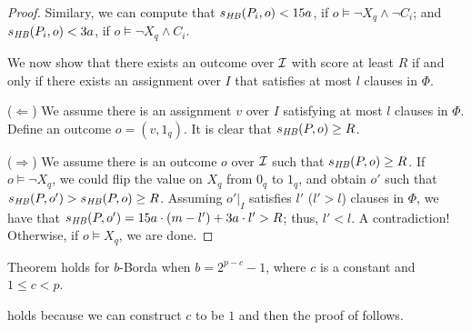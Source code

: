 \begin{proof}
Similary, we can compute that
$s_{\mathit{HB}}(P_i,o)<15a$, if $o \models \neg X_q \land \neg C_i$; and
$s_{\mathit{HB}}(P_i,o)<3a$, if $o \models \neg X_q \land C_i$.

We now show that there exists an outcome over $\mathcal{I}$ with score at least 
$R$ if and only if there exists an assignment over $I$ that satisfies at 
most $l$ clauses in $\Phi$.

\smallskip
\noindent
($\Leftarrow$) We assume there is an assignment $v$ over $I$ satisfying at 
most $l$ clauses in $\Phi$. Define an outcome $o=(v,1_q)$. It is clear 
that $s_{\mathit{HB}}(P,o)\geq R$.

\smallskip
\noindent
($\Rightarrow$) We assume there is an outcome $o$ over $\mathcal{I}$ such that 
$s_{\mathit{HB}}(P,o)\geq R$. If $o \models \neg X_q$, we could flip the value 
on $X_q$ from $0_q$ to $1_q$, and obtain $o'$ such that 
$s_{\mathit{HB}}(P,o')>s_{\mathit{HB}}(P,o)\geq R$. Assuming $o'|_I$ satisfies $l'$ 
($l'>l$) clauses in $\Phi$, we have that 
$s_{\mathit{HB}}(P,o')=15a\cdot (m-l')+3a\cdot l'> R$; thus, $l'<l$. A contradiction!
Otherwise, if $o \models X_q$, we are done.
\end{proof}

\begin{cor}
\label{cor:confusing}
	Theorem  holds for $b$-Borda when 
	$b=2^{p-c}-1$, where $c$ is a constant and $1 \leq c < p$.
\end{cor}
 holds because we can construct $c$ to be $1$ and then
the proof of  follows.

